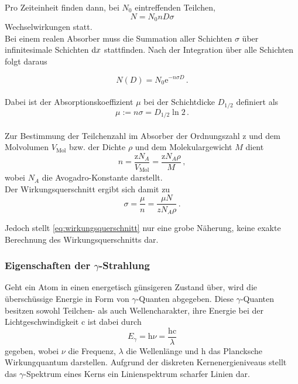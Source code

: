 Pro Zeiteinheit finden dann, bei $N_0$ eintreffenden Teilchen,
\begin{equation}
    N = N_0 n D \sigma
    \label{eq:wechselwirkgamma}
\end{equation}
Wechselwirkungen statt. \\

Bei einem realen Absorber muss die Summation aller Schichten $\sigma$
über infinitesimale Schichten $\mathrm{d} x$ stattfinden.
Nach der Integration über alle Schichten folgt daraus

\begin{equation}
    N(D) = N_0 \mathrm{e}^{-n \sigma D} \,.
    \label{eq:wechselwirkgammaexp}
\end{equation} \\

Dabei ist der Absorptionskoeffizient $\mu$ 
bei der Schichtdicke $D_{1/2}$ definiert als
\begin{equation*}
    \mu := n \sigma = D_{1/2} \ln 2 \,.
\end{equation*} \\

Zur Bestimmung der Teilchenzahl im Absorber der Ordnungszahl $\text{z}$ und
dem Molvolumen $V_{\text{Mol}}$ bzw. der Dichte $\rho$ und dem
Molekulargewicht $M$ dient
\begin{equation*}
    n = \frac{\text{z} N_A}{V_{\text{Mol}}} = \frac{\text{z} N_A \rho}{M} \,,
\end{equation*}
wobei $N_A$ die Avogadro-Konstante darstellt. \\

Der Wirkungsquerschnitt ergibt sich damit zu
\begin{equation}
    \sigma = \frac{\mu}{n} = \frac{\mu N}{z N_A \rho} \,.
    \label{eq:wirkungsquerschnitt}
\end{equation}

Jedoch stellt \eqref{eq:wirkungsquerschnitt} nur eine grobe Näherung,
keine exakte Berechnung des Wirkungsquerschnitts dar. \\


\subsubsection*{Eigenschaften der $\gamma$-Strahlung}

Geht ein Atom in einen energetisch günsigeren Zustand über, wird die
überschüssige Energie in Form von $\gamma$-Quanten abgegeben.
Diese $\gamma$-Quanten besitzen sowohl Teilchen- als auch Wellencharakter,
ihre Energie bei der Lichtgeschwindigkeit $\mathrm{c}$ ist dabei durch
\begin{equation*}
    E_\gamma = \mathrm{h} \nu = \frac{\text{h} \mathrm{c}}{\lambda}
\end{equation*}
gegeben, wobei $\nu$ die Frequenz, $\lambda$ die Wellenlänge 
und $\mathrm{h}$ das Plancksche Wirkungquantum darstellen.
Aufgrund der diskreten Kernenergieniveaus stellt das $\gamma$-Spektrum
eines Kerns ein Linienspektrum scharfer Linien dar.


